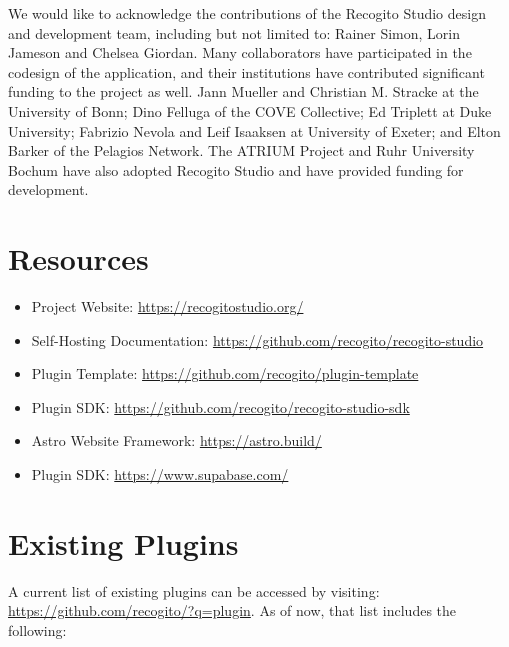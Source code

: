 \documentclass[final]{anthology-ch}         %
\begin{document}
We would like to acknowledge the contributions of the Recogito Studio design and development team, including but not limited to: Rainer Simon, Lorin Jameson and Chelsea Giordan. Many collaborators have participated in the codesign of the application, and their institutions have contributed significant funding to the project as well. Jann Mueller and Christian M. Stracke at the University of Bonn; Dino Felluga of the COVE Collective; Ed Triplett at Duke University; Fabrizio Nevola and Leif Isaaksen at University of Exeter; and Elton Barker of the Pelagios Network. The ATRIUM Project and Ruhr University Bochum have also adopted Recogito Studio and have provided funding for development.

\printbibliography

\appendix

\section{Resources} \label{appdx:first_appendix_resources}
\begin{itemize}
  \item Project Website: \url{https://recogitostudio.org/}
  \item Self-Hosting Documentation: \url{https://github.com/recogito/recogito-studio}
  \item Plugin Template: \url{https://github.com/recogito/plugin-template}
  \item Plugin SDK: \url{https://github.com/recogito/recogito-studio-sdk}
  \item Astro Website Framework: \url{https://astro.build/}
  \item Plugin SDK: \url{https://www.supabase.com/}
\end{itemize}

\section{Existing Plugins} \label{appdx:second_appendix_plugins}

A current list of existing plugins can be accessed by visiting: \href{https://github.com/recogito/?q=plugin}{https://github.com/recogito/?q=plugin}. As of now, that list includes the following:
\end{document}
